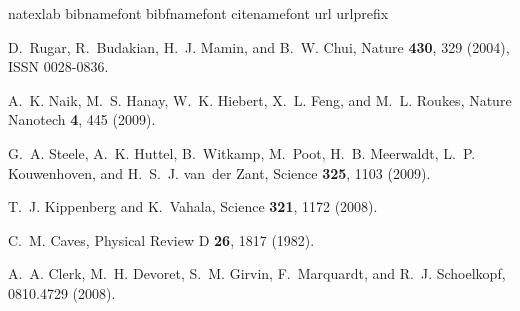 \documentclass[twocolumn,english,aps,prl,superscriptaddress,showpacs,preprintnumbers]{revtex4}
\begin{document}
\begin{thebibliography}{27}
\expandafter\ifx\csname natexlab\endcsname\relax\fi
\expandafter\ifx\csname bibnamefont\endcsname\relax
  \fi
\expandafter\ifx\csname bibfnamefont\endcsname\relax
  \fi
\expandafter\ifx\csname citenamefont\endcsname\relax
  \fi
\expandafter\ifx\csname url\endcsname\relax
  \fi
\expandafter\ifx\csname urlprefix\endcsname\relax\fi
\providecommand{\bibinfo}[2]{#2}
\providecommand{\eprint}[2][]{{\texttt{{#2}}}}

\bibinfo{author}{{{D.}}~{{Rugar}}},
  \bibinfo{author}{{{R.}}~{{Budakian}}},
  \bibinfo{author}{{{H.~J.}} {{Mamin}}}, {{and}}
  \bibinfo{author}{{{B.~W.}} {{Chui}}},
  \bibinfo{journal}{Nature} \textbf{\bibinfo{volume}{430}},
  \bibinfo{pages}{329} (\bibinfo{year}{2004}), ISSN \bibinfo{issn}{0028-0836}.

\bibinfo{author}{{{A.~K.}} {{Naik}}},
  \bibinfo{author}{{{M.~S.}} {{Hanay}}},
  \bibinfo{author}{{{W.~K.}} {{Hiebert}}},
  \bibinfo{author}{{{X.~L.}} {{Feng}}}, {{and}}
  \bibinfo{author}{{{M.~L.}} {{Roukes}}},
  \bibinfo{journal}{Nature Nanotech} \textbf{\bibinfo{volume}{4}},
  \bibinfo{pages}{445 } (\bibinfo{year}{2009}).

\bibinfo{author}{{{G.~A.}} {{Steele}}},
  \bibinfo{author}{{{A.~K.}} {{Huttel}}},
  \bibinfo{author}{{{B.}}~{{Witkamp}}},
  \bibinfo{author}{{{M.}}~{{Poot}}},
  \bibinfo{author}{{{H.~B.}} {{Meerwaldt}}},
  \bibinfo{author}{{{L.~P.}} {{Kouwenhoven}}},
  {{and}} \bibinfo{author}{{{H.~S.~J.}}
  {{van~der Zant}}}, \bibinfo{journal}{Science}
  \textbf{\bibinfo{volume}{325}}, \bibinfo{pages}{1103} (\bibinfo{year}{2009}).

\bibinfo{author}{{{T.~J.}} {{Kippenberg}}}
  {{and}} \bibinfo{author}{{{K.}}~{{Vahala}}},
  \bibinfo{journal}{Science} \textbf{\bibinfo{volume}{321}},
  \bibinfo{pages}{1172} (\bibinfo{year}{2008}).

\bibinfo{author}{{{C.~M.}} {{Caves}}},
  \bibinfo{journal}{Physical Review D} \textbf{\bibinfo{volume}{26}},
  \bibinfo{pages}{1817} (\bibinfo{year}{1982}).

\bibinfo{author}{{{A.~A.}} {{Clerk}}},
  \bibinfo{author}{{{M.~H.}} {{Devoret}}},
  \bibinfo{author}{{{S.~M.}} {{Girvin}}},
  \bibinfo{author}{{{F.}}~{{Marquardt}}},
  {{and}} \bibinfo{author}{{{R.~J.}}
  {{Schoelkopf}}}, \bibinfo{journal}{0810.4729}
  (\bibinfo{year}{2008}).


\end{thebibliography}
\end{document}
